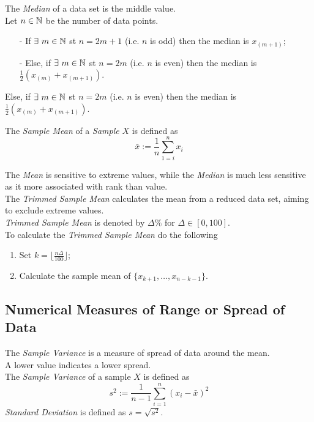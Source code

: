 \documentclass[11pt,a4paper]{article}
\begin{document}
The \textit{Median} of a data set is the middle value.\\
Let $n\in\mathbb{N}$ be the number of data points.
\begin{itemize}
	\item[-] If $\exists\ m\in\mathbb{N}$ st $n=2m+1$ (i.e. $n$ is odd) then the median is $x_{(m+1)}$;
	\item[-] Else, if $\exists\ m\in\mathbb{N}$ st $n=2m$ (i.e. $n$ is even) then the median is $\frac{1}{2}(x_{(m)}+x_{(m+1)})$.
\end{itemize}
Else, if $\exists\ m\in\mathbb{N}$ st $n=2m$ (i.e. $n$ is even) then the median is $\frac{1}{2}(x_{(m)}+x_{(m+1)})$.

The \textit{Sample Mean} of a \textit{Sample} $X$ is defined as
$$\bar{x}:=\frac{1}{n}\sum_{1=i}^nx_i$$

The \textit{Mean} is sensitive to extreme values, while the \textit{Median} is much less sensitive as it more associated with rank than value.\\

The \textit{Trimmed Sample Mean} calculates the mean from a reduced data set, aiming to exclude extreme values.\\
\textit{Trimmed Sample Mean} is denoted by $\Delta\%$ for $\Delta\in[0,100]$.\\
To calculate the \textit{Trimmed Sample Mean} do the following
\begin{enumerate}[label=\roman*)]
	\item Set $k=\lfloor\frac{n\Delta}{100}\rfloor$;
	\item Calculate the sample mean of $\{x_{k+1},\dots,x_{n-k-1}\}$.
\end{enumerate}

\subsection{Numerical Measures of Range or Spread of Data}

The \textit{Sample Variance} is a measure of spread of data around the mean.\\
A lower value indicates a lower spread.\\
The \textit{Sample Variance} of a sample $X$ is defined as
$$s^2:=\dfrac{1}{n-1}\sum\limits_{i=1}^n(x_i-\bar{x})^2$$
\nb \textit{Standard Deviation} is defined as $s=\sqrt{s^2}$.\\
\end{document}
